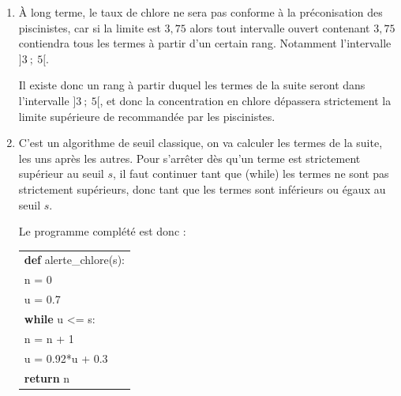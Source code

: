 \begin{enumerate}
\begin{enumerate}
		\item De la question précédente, on retient :
		\begin{itemize}
			\item $\forall n \in \N,\quad v_n \leqslant v_{n+1}$\quad donc la suite $\left(v_n\right)$ est croissante;
			\item $\forall n \in \N,\quad v_n \leqslant 4$ \quad donc la suite $\left(v_n\right)$ est majorée par 4.
		\end{itemize}
D'après le théorème de croissance monotone la suite $\left(v_n\right)$ est donc convergente, vers une limite $\ell$ inférieure ou égale à 4.

		De plus, la suite $\left(v_n\right)$ est définie par récurrence, et la fonction de récurrence : \quad $x\longmapsto 0,92x + 0,3$ \quad est continue sur $\R$, puisque c'est une fonction affine, donc la suite ne peut converger que vers un point fixe de la fonction de récurrence

$\ell$ est donc une solution de l'équation :\quad $\aligned[t] x = 0,92x + 0,3 &\iff 0,08x = 0,3\\&\iff x = \dfrac{0,3}{0,08}\\&\iff x = 3,75\endaligned$

L'équation n'a qu'une solution, donc la suite $\left(v_n\right)$ converge vers $3,75$.
	\end{enumerate}
\item À long terme, le taux de chlore ne sera pas conforme à la préconisation des piscinistes, car si la limite est $3,75$  alors tout intervalle ouvert contenant $3,75$  contiendra tous les termes à partir d'un certain rang. Notamment l'intervalle $]3~;~5[$.

Il existe donc un rang à partir duquel les termes de la suite seront dans l'intervalle $]3~;~5[$, et donc la concentration en chlore dépassera strictement la limite supérieure de  recommandée par les piscinistes.

	\item C'est un algorithme de seuil classique, on va calculer les termes de la suite, les uns après les autres. Pour s'arrêter dès qu'un terme est strictement supérieur au seuil $s$, il faut continuer tant que (while) les termes ne sont pas strictement supérieurs, donc tant que les termes sont inférieurs ou égaux au seuil $s$.

Le programme complété est donc :

	\begin{center}
	\begin{tabular}{|l|}\hline
		\textbf{def} alerte\_chlore(s):\\
		\qquad n = 0\\
		\qquad u = 0.7\\
		\qquad \textbf{while} u <= s:\\
		\qquad \qquad n = n + 1 \\
		\qquad \qquad u = 0.92*u + 0.3\\
		\qquad \textbf{return} n\\ \hline
	\end{tabular}
\end{center}


\end{enumerate}
